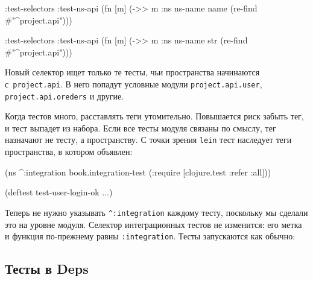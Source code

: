 \ifnarrow

\begin{english}
  \begin{clojure}
:test-selectors
  {:test-ns-api
   (fn [m]
     (->> m :ns ns-name name
          (re-find #"^project.api")))}
  \end{clojure}
\end{english}

\else

\begin{english}
  \begin{clojure}
:test-selectors
  {:test-ns-api
    (fn [m] (->> m :ns ns-name str
                 (re-find #"^project.api")))}
  \end{clojure}
\end{english}

\fi

Новый селектор ищет только те тесты, чьи пространства начинаются
с~\verb|project.api|. В него попадут условные модули \verb|project.api.user|,
\verb|project.api.oreders| и другие.

Когда тестов много, расставлять теги утомительно. Повышается риск забыть тег, и
тест выпадет из набора. Если все тесты модуля связаны по смыслу, тег назначают
не тесту, а пространству. С точки зрения \verb|lein| тест наследует теги
пространства, в котором объявлен:

\begin{english}
  \begin{clojure}
(ns ^:integration
  book.integration-test
  (:require [clojure.test :refer :all]))

(deftest test-user-login-ok
  ...)
  \end{clojure}
\end{english}

Теперь не нужно указывать \verb|^:integration| каждому тесту, поскольку мы
сделали это на уровне модуля. Селектор интеграционных тестов не изменится: его
метка и функция по-прежнему равны \verb|:integration|. Тесты запускаются как
обычно:

\begin{english}
\end{english}

\subsection{Тесты в Deps}

